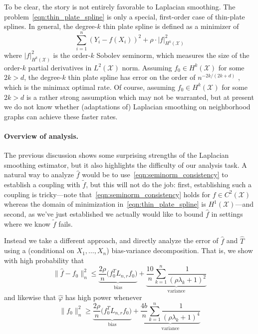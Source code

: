 \documentclass[twoside]{article}
\newcommand{\1}{\mathbf{1}}
\newcommand{\Lap}{L}
\newcommand{\Xset}{\mathcal{X}}
\newcommand{\wt}[1]{\widetilde{#1}}
\newcommand{\wh}[1]{\widehat{#1}}
\theoremstyle{definition}
\theoremstyle{remark}
\begin{document}
To be clear, the story is not entirely favorable to Laplacian smoothing. The problem~\eqref{eqn:thin_plate_spline} is only a special, first-order case of thin-plate splines. In general, the degree-$k$ thin plate spline is defined as a minimizer of
\begin{equation*}
\sum_{i = 1}^{n} (Y_i - f(X_i))^2 + \rho \cdot |f|_{H^k(\Xset)}^2
\end{equation*}
where $|f|_{H^k(\Xset)}^2$ is the order-$k$ Sobolev seminorm, which measures the size of the order-$k$ partial derivatives in $L^2(\Xset)$ norm. Assuming $f_0 \in H^k(\Xset)$ for some $2k > d$, the degree-$k$ thin plate spline has error on the order of $n^{-2k/(2k + d)}$ \citep{vandergeer2000}, which is the minimax optimal rate. Of course, assuming $f_0 \in H^k(\Xset)$ for some $2k > d$ is a rather strong assumption which may not be warranted, but at present we do not know whether (adaptations of) Laplacian smoothing on neighborhood graphs can achieve these faster rates.

\paragraph{Overview of analysis.}
The previous discussion shows some surprising strengths of the Laplacian smoothing estimator, but it also highlights the difficulty of our analysis task. A natural way to analyze $\wh{f}$ would be to use~\eqref{eqn:seminorm_consistency} to establish a coupling with $\wt{f}$, but this will not do the job: first, establishing such a coupling is tricky---note that~\eqref{eqn:seminorm_consistency} holds for $f \in C^2(\Xset)$ whereas the domain of minimization in~\eqref{eqn:thin_plate_spline} is $H^1(\Xset)$---and second, as we've just established we actually would like to bound $\wh{f}$ in settings where we know $\wt{f}$ fails.

Instead we take a different approach, and directly analyze the error of $\wh{f}$ and $\wh{T}$ using a (conditional on $X_1,\ldots,X_n$) bias-variance decomposition. That is, we show with high probability that
\begin{equation*}
\bigl\|\wh{f} - f_0\bigr\|_n^2 \leq \underbrace{\frac{2\rho}{n} \bigl(f_0^T \Lap_{n,r} f_0\bigr)}_{\textrm{bias}} + \underbrace{\frac{10}{n} \sum_{k = 1}^{n} \frac{1}{(\rho \lambda_k + 1)^2}}_{\textrm{variance}}
\end{equation*}
and likewise that $\wh{\varphi}$ has high power whenever
\begin{equation*}
\bigl\|f_0\bigr\|_n^2 \geq \underbrace{\frac{2\rho}{n} \bigl(f_0^T \Lap_{n,r} f_0\bigr)}_{\textrm{bias}} + \underbrace{\frac{4b}{n} \sum_{k = 1}^{n} \frac{1}{(\rho \lambda_k + 1)^4}}_{\textrm{variance}}
\end{equation*}
\end{document}
